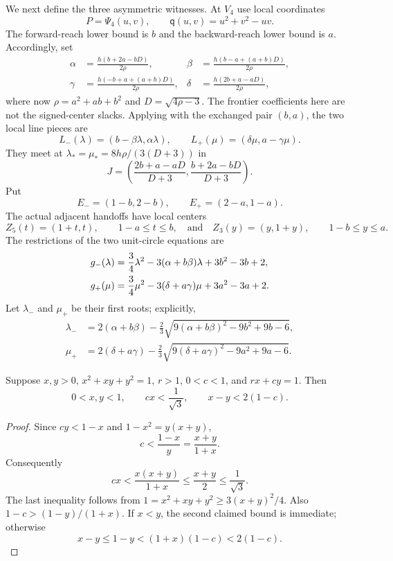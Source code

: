 We next define the three asymmetric witnesses.  At $V_4$ use local
coordinates
\[
 P=\Psi_4(u,v),\qquad
 \mathsf q(u,v)=u^2+v^2-uv.
\]
The forward-reach lower bound is $b$ and the backward-reach lower bound is $a$.  Accordingly,
set
\begin{align*}
 \alpha&=\frac{h(b+2a-bD)}{2\rho},&
 \beta&=\frac{h(b-a+(a+b)D)}{2\rho},\\
 \gamma&=\frac{h(-b+a+(a+b)D)}{2\rho},&
 \delta&=\frac{h(2b+a-aD)}{2\rho},
\end{align*}
where now $\rho=a^2+ab+b^2$ and $D=\sqrt{4\rho-3}$.  The frontier coefficients here are not the signed-center slacks.
Applying  with the exchanged pair $(b,a)$,
the two local line pieces are
\[
 L_-(\lambda)=(b-\beta\lambda,\alpha\lambda),\qquad
 L_+(\mu)=(\delta\mu,a-\gamma\mu).
\]
They meet at $\lambda_* =\mu_*=8h\rho/(3(D+3))$ in
\begin{equation}
 J=\left(\frac{2b+a-aD}{D+3},
          \frac{b+2a-bD}{D+3}\right).           \label{eq:line-junction}
\end{equation}
Put
\[
 E_-=(1-b,2-b),\qquad E_+=(2-a,1-a).
\]
The actual adjacent handoffs have local centers
\[
 Z_5(t)=(1+t,t),\qquad 1-a\le t\le b,
 \quad\text{and}\quad
 Z_3(y)=(y,1+y),\qquad 1-b\le y\le a.
\]
The restrictions of the two unit-circle equations are
\begin{align}
 g_-(\lambda)&=\frac34\lambda^2
 -3(\alpha+b\beta)\lambda+3b^2-3b+2,\notag\\
 g_+(\mu)&=\frac34\mu^2
 -3(\delta+a\gamma)\mu+3a^2-3a+2.              \label{eq:witness-quadratics}
\end{align}
Let $\lambda_-$ and $\mu_+$ be their first roots; explicitly,
\begin{align*}
 \lambda_-&=2(\alpha+b\beta)
 -\frac23\sqrt{9(\alpha+b\beta)^2-9b^2+9b-6},\\
 \mu_+&=2(\delta+a\gamma)
 -\frac23\sqrt{9(\delta+a\gamma)^2-9a^2+9a-6}.
\end{align*}

\begin{lemma}
\label{lem:F-normal-pair-bounds}
Suppose $x,y>0$, $x^2+xy+y^2=1$, $r>1$, $0<c<1$, and
$rx+cy=1$. Then
\[
 0<x,y<1,\qquad cx<\frac1{\sqrt3},\qquad x-y<2(1-c).
\]
\end{lemma}
\begin{proof}
Since $cy<1-x$ and $1-x^2=y(x+y)$,
\[
 c<\frac{1-x}{y}=\frac{x+y}{1+x}.
\]
Consequently
\[
 cx<\frac{x(x+y)}{1+x}\le\frac{x+y}{2}\le\frac1{\sqrt3}.
\]
The last inequality follows from
$1=x^2+xy+y^2\ge3(x+y)^2/4$.
Also $1-c>(1-y)/(1+x)$. If $x<y$, the second claimed
bound is immediate; otherwise
\[
 x-y\le1-y<(1+x)(1-c)<2(1-c).
\]
\end{proof}

